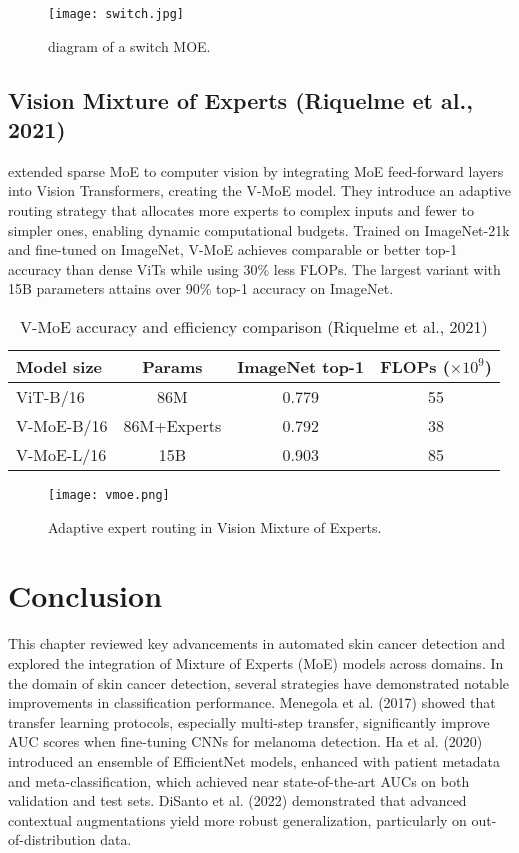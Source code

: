 \begin{figure}[H]
  \centering
  \texttt{[image: switch.jpg]}
  \caption{diagram of a switch MOE.}
  \label{fig:switch-transformer}
\end{figure}

\subsection{Vision Mixture of Experts (Riquelme et al., 2021)}
\textcite{riquelme2021scaling} extended sparse MoE to computer vision by integrating MoE feed-forward layers into Vision Transformers, creating the V-MoE model. They introduce an adaptive routing strategy that allocates more experts to complex inputs and fewer to simpler ones, enabling dynamic computational budgets. Trained on ImageNet-21k and fine-tuned on ImageNet, V-MoE achieves comparable or better top-1 accuracy than dense ViTs while using 30\% less FLOPs. The largest variant with 15B parameters attains over 90\% top-1 accuracy on ImageNet.

\begin{table}[h!]
  \centering
  \caption{V-MoE accuracy and efficiency comparison (Riquelme et al., 2021)}
  \label{tab:vmoe-results}
  \begin{tabular}{lccc}
    \hline
    Model size & Params & ImageNet top-1 & FLOPs ($\times10^9$) \\
    \hline
    ViT-B/16 & 86M & 0.779 & 55 \\
    V-MoE-B/16 & 86M+Experts & 0.792 & 38 \\
    V-MoE-L/16 & 15B & 0.903 & 85 \\
    \hline
  \end{tabular}
\end{table}

\begin{figure}[ht]
  \centering
  \texttt{[image: vmoe.png]}
  \caption{Adaptive expert routing in Vision Mixture of Experts.}
  \label{fig:vmoe-routing}
\end{figure}

\section{Conclusion}

This chapter reviewed key advancements in automated skin cancer detection and explored the integration of Mixture of Experts (MoE) models across domains. In the domain of skin cancer detection, several strategies have demonstrated notable improvements in classification performance. Menegola et al. (2017) showed that transfer learning protocols, especially multi-step transfer, significantly improve AUC scores when fine-tuning CNNs for melanoma detection. Ha et al. (2020) introduced an ensemble of EfficientNet models, enhanced with patient metadata and meta-classification, which achieved near state-of-the-art AUCs on both validation and test sets. DiSanto et al. (2022) demonstrated that advanced contextual augmentations yield more robust generalization, particularly on out-of-distribution data.

